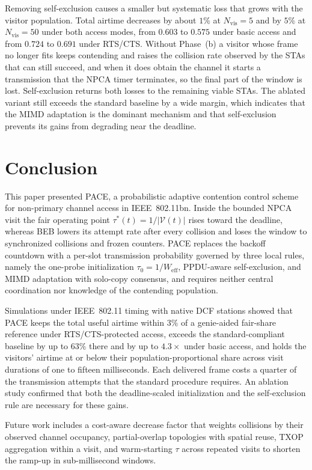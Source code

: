 \documentclass[conference]{IEEEtran}
\newcommand{\Nvis}{N_\mathrm{vis}}
\begin{document}
Removing self-exclusion causes a smaller but systematic loss that
grows with the visitor population. Total airtime decreases by about
$1\%$ at $\Nvis=5$ and by $5\%$ at $\Nvis=50$ under both access
modes, from $0.603$ to $0.575$ under basic access and from $0.724$ to
$0.691$ under RTS/CTS. Without Phase~(b) a visitor whose frame no
longer fits keeps contending and raises the collision rate observed by
the STAs that can still succeed, and when it does obtain the channel
it starts a transmission that the NPCA timer terminates, so the final
part of the window is lost. Self-exclusion returns both losses to the
remaining viable STAs. The ablated variant still exceeds the standard
baseline by a wide margin, which indicates that the MIMD adaptation is
the dominant mechanism and that self-exclusion prevents its gains from
degrading near the deadline.

\section{Conclusion}
\label{sec:conclusion}

This paper presented PACE, a probabilistic adaptive contention control
scheme for non-primary channel access in IEEE~802.11bn. Inside the
bounded NPCA visit the fair operating point
$\tau^*(t)=1/|\mathcal{V}(t)|$ rises toward the deadline, whereas BEB
lowers its attempt rate after every collision and loses the window to
synchronized collisions and frozen counters. PACE replaces the backoff
countdown with a per-slot transmission probability governed by three
local rules, namely the one-probe initialization
$\tau_0=1/W_\mathrm{eff}$, PPDU-aware self-exclusion, and MIMD
adaptation with solo-copy consensus, and requires neither central
coordination nor knowledge of the contending population.

Simulations under IEEE~802.11 timing with native DCF stations showed
that PACE keeps the total useful airtime within $3\%$ of a genie-aided
fair-share reference under RTS/CTS-protected access, exceeds the
standard-compliant baseline by up to $63\%$ there and by up to
$4.3\times$ under basic access, and holds the visitors' airtime at or
below their population-proportional share across visit durations of
one to fifteen milliseconds. Each delivered frame costs a quarter of
the transmission attempts that the standard procedure requires. An
ablation study confirmed that both the deadline-scaled initialization
and the self-exclusion rule are necessary for these gains.

Future work includes a cost-aware decrease factor that weights
collisions by their observed channel occupancy, partial-overlap
topologies with spatial reuse, TXOP aggregation within a visit, and
warm-starting $\tau$ across repeated visits to shorten the ramp-up in
sub-millisecond windows.



\end{document}
